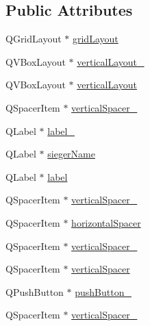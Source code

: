 \subsection*{Public Attributes}
\begin{DoxyCompactItemize}
\item 
Q\-Grid\-Layout $\ast$ \hyperlink{classUi__gewinner_a5fa03a2e27a9588060a283a779a65a58}{grid\-Layout}
\item 
Q\-V\-Box\-Layout $\ast$ \hyperlink{classUi__gewinner_aec0ff80f4e4eb96f73cd49075caeee25}{vertical\-Layout\-\_}
\item 
Q\-V\-Box\-Layout $\ast$ \hyperlink{classUi__gewinner_a396f96da84e2c817a573ea653cf56090}{vertical\-Layout}
\item 
Q\-Spacer\-Item $\ast$ \hyperlink{classUi__gewinner_a1d1c3d0c24f7155e4c396ef6b3cdec55}{vertical\-Spacer\-\_}
\item 
Q\-Label $\ast$ \hyperlink{classUi__gewinner_a4fbf4a6a07e338c3c533d78228089e5d}{label\-\_}
\item 
Q\-Label $\ast$ \hyperlink{classUi__gewinner_ad62e038443d824f3cdd7b441f83b46eb}{sieger\-Name}
\item 
Q\-Label $\ast$ \hyperlink{classUi__gewinner_ab3ebd95d03d05884cc9c3c305f3231db}{label}
\item 
Q\-Spacer\-Item $\ast$ \hyperlink{classUi__gewinner_a3be237b715dad02b18b0d97589be8eb2}{vertical\-Spacer\-\_}
\item 
Q\-Spacer\-Item $\ast$ \hyperlink{classUi__gewinner_a41890d071db44fc57cb6b7f7be994d88}{horizontal\-Spacer}
\item 
Q\-Spacer\-Item $\ast$ \hyperlink{classUi__gewinner_a3be0328d0d76637657a7a6407e911cb6}{vertical\-Spacer\-\_}
\item 
Q\-Spacer\-Item $\ast$ \hyperlink{classUi__gewinner_a31eeaf8bb5e6f7c768d5b7814041f6b7}{vertical\-Spacer}
\item 
Q\-Push\-Button $\ast$ \hyperlink{classUi__gewinner_ac3ddecfc2295e4ddbbfe5e1672943ab4}{push\-Button\-\_}
\item 
Q\-Spacer\-Item $\ast$ \hyperlink{classUi__gewinner_ad278ce9c684f545f19a793534fbf3212}{vertical\-Spacer\-\_}
\end{DoxyCompactItemize}


